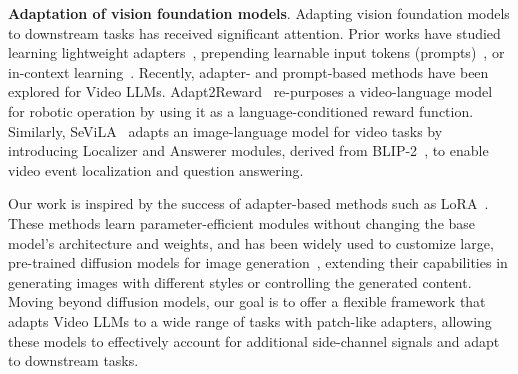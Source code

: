 

\medskip
\noindent \textbf{Adaptation of vision foundation models}. Adapting vision foundation models to downstream tasks has received significant attention. Prior works have studied learning lightweight adapters~\cite{rebuffi2017learning,lian2022scaling,bhattacharjee2023vision,chen2022adaptformer,sung2022vl,chen2023vision}, prepending learnable input tokens (\eg prompts)~\cite{zhou2022learning,jia2022visual}, or in-context learning~\cite{wang2023images,xu2024towards,bar2022visual,zhang2023makes}. Recently, adapter- and prompt-based methods have been explored for Video LLMs. Adapt2Reward~\cite{yang2024adapt2reward} re-purposes a video-language model for robotic operation by using it as a language-conditioned reward function. Similarly, SeViLA~\cite{yu2024self} adapts an image-language model for video tasks by introducing Localizer and Answerer modules, derived from BLIP-2~\cite{li2023blip2bootstrappinglanguageimagepretraining}, to enable video event localization and question answering.

Our work is inspired by the success of adapter-based methods such as LoRA~\cite{hu2021loralowrankadaptationlarge}. These methods learn parameter-efficient modules without changing the base model's architecture and weights, and has been widely used to customize large, pre-trained diffusion models for image generation~\cite{kumari2022multiconcept,xiao2023fastcomposer,gu2023mixofshow,wang2023autostory,shah2023ziplora,zhong2024multi}, extending their capabilities in generating images with different styles or controlling the generated content. Moving beyond diffusion models, our goal is to offer a flexible framework that adapts Video LLMs to a wide range of tasks with patch-like adapters, allowing these models to effectively account for additional side-channel signals and adapt to downstream tasks.


